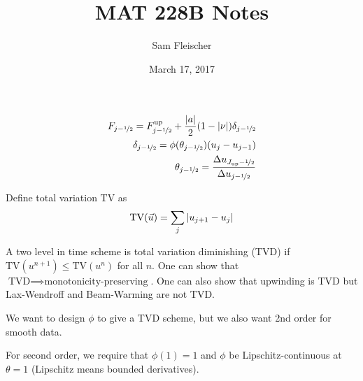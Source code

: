 \documentclass{article}
\title{MAT 228B Notes}
\author{Sam Fleischer}
\date{March 17, 2017}
\newcommand{\half}{\nicefrac{1}{2}}
\begin{document}
    \maketitle

    \begin{align*}
        F_{j-\half} = F_{j-\half}^\text{up} + \frac{\abs{a}}{2}\qty(1 - \abs{\nu})\delta_{j-\half} \\
        \delta_{j-\half} = \phi(\theta_{j-\half})\qty(u_j - u_{j-1}) \\
        \theta_{j-\half} = \frac{\Delta u_{J_\text{up}-\half}}{\Delta u_{j-\half}}
    \end{align*}

    Define total variation $\text{TV}$ as
    \begin{align*}
        \text{TV}(\vec{u}) = \sum_{j}\abs{u_{j+1} - u_j}
    \end{align*}

    A two level in time scheme is total variation diminishing (TVD) if $\text{TV}(u^{n+1}) \leq \text{TV}(u^n)$ for all $n$.  One can show that $\text{TVD}\implies\text{monotonicity-preserving}$.  One can also show that upwinding is TVD but Lax-Wendroff and Beam-Warming are not TVD.

    We want to design $\phi$ to give a TVD scheme, but we also want 2nd order for smooth data.

    For second order, we require that $\phi(1) = 1$ and $\phi$ be  Lipschitz-continuous at $\theta = 1$ (Lipschitz means bounded derivatives).
\end{document}
